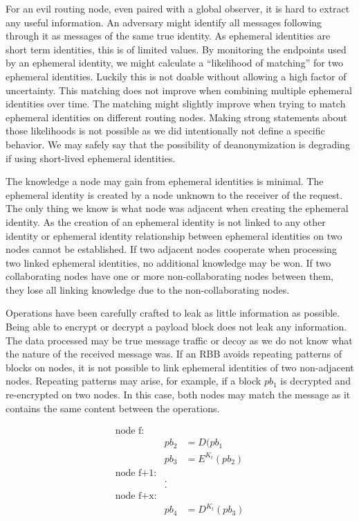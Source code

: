 For an evil routing node, even paired with a global observer, it is hard to extract any useful information. An adversary might identify all messages following through it as messages of the same true identity. As ephemeral identities are short term identities, this is of limited values. By monitoring the endpoints used by an ephemeral identity, we might calculate a ``likelihood of matching'' for two ephemeral identities. Luckily this is not doable without allowing a high factor of uncertainty. This matching does not improve when combining multiple ephemeral identities over time. The matching might slightly improve when trying to match ephemeral identities on different routing nodes. Making strong statements about those likelihoods is not possible as we did intentionally not define a specific behavior. We may safely say that the possibility of deanonymization is degrading if using short-lived ephemeral identities.

The knowledge a node may gain from ephemeral identities is minimal. The ephemeral identity is created by a node unknown to the receiver of the request. The only thing we know is what node was adjacent when creating the ephemeral identity. As the creation of an ephemeral identity is not linked to any other identity or ephemeral identity relationship between ephemeral identities on two nodes cannot be established. If two adjacent nodes cooperate when processing two linked ephemeral identities, no additional knowledge may be won. If two collaborating nodes have one or more non-collaborating nodes between them, they lose all linking knowledge due to the non-collaborating nodes. 

Operations have been carefully crafted to leak as little information as possible. Being able to encrypt or decrypt a payload block does not leak any information. The data processed may be true message traffic or decoy as we do not know what the nature of the received message was. If an RBB avoids repeating patterns of blocks on nodes, it is not possible to link ephemeral identities of two non-adjacent nodes. Repeating patterns may arise, for example, if a block $pb_1$ is decrypted and re-encrypted on two nodes. In this case, both nodes may match the message as it contains the same content between the operations.

\begin{eqnarray*}
	\text{node f:}\\
	& pb_2 & = D(pb_1\\
	& pb_3 & = E^{K_t}(pb_2)\\
	\text{node f+1:}\\
	&.\\
	&.\\    
	\text{node f+x:}\\
	& pb_4 & = D^{K_t}(pb_3)\\
\end{eqnarray*}

